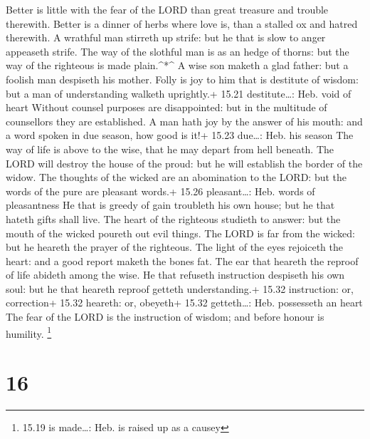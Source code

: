  Better is little with the fear of the LORD than great
treasure and trouble therewith.  Better is a dinner of
herbs where love is, than a stalled ox and hatred therewith.
 A wrathful man stirreth up strife: but he that is slow to
anger appeaseth strife.  The way of the slothful man is as
an hedge of thorns: but the way of the righteous is made plain.\^{}*\^{}
 A wise son maketh a glad father: but a foolish man
despiseth his mother.  Folly is joy to him that is
destitute of wisdom: but a man of understanding walketh uprightly.+
15.21 destitute\ldots: Heb. void of heart  Without counsel
purposes are disappointed: but in the multitude of counsellors they are
established.  A man hath joy by the answer of his mouth:
and a word spoken in due season, how good is it!+ 15.23 due\ldots: Heb.
his season  The way of life is above to the wise, that he
may depart from hell beneath.  The LORD will destroy the
house of the proud: but he will establish the border of the widow.
 The thoughts of the wicked are an abomination to the LORD:
but the words of the pure are pleasant words.+ 15.26 pleasant\ldots:
Heb. words of pleasantness  He that is greedy of gain
troubleth his own house; but he that hateth gifts shall live.
 The heart of the righteous studieth to answer: but the
mouth of the wicked poureth out evil things.  The LORD is
far from the wicked: but he heareth the prayer of the righteous.
 The light of the eyes rejoiceth the heart: and a good
report maketh the bones fat.  The ear that heareth the
reproof of life abideth among the wise.  He that refuseth
instruction despiseth his own soul: but he that heareth reproof getteth
understanding.+ 15.32 instruction: or, correction+ 15.32 heareth: or,
obeyeth+ 15.32 getteth\ldots: Heb. possesseth an heart  The
fear of the LORD is the instruction of wisdom; and before honour is
humility. \footnote{15.19 is made\ldots: Heb. is raised up as a causey}

\hypertarget{section-15}{%
\section{16}\label{section-15}}


